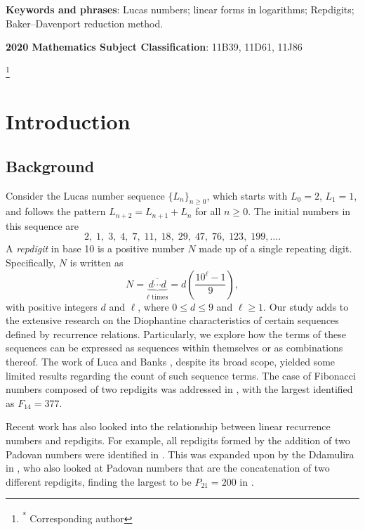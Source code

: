 \maketitle
\begin{abstract}
  Let $ \{L_n\}_{n\geq 0} $ be the sequence of Lucas numbers. In this paper, we determine all Lucas numbers that are palindromic concatenations of two distinct repdigits.
\end{abstract}

{\bf Keywords and phrases}: Lucas numbers; linear forms in logarithms; Repdigits; Baker--Davenport reduction method.
 
{\bf 2020 Mathematics Subject Classification}: 11B39, 11D61, 11J86

\thanks{\textsuperscript{*} Corresponding author}

\section{Introduction}\label{intro}
\subsection{Background}
\label{sec:1.1}
Consider the Lucas number sequence $\{L_n\}_{n\ge 0}$, which starts with $L_0=2$, $L_1=1$, and follows the pattern $L_{n+2}=L_{n+1}+L_{n}$ for all $n \geq 0$. The initial numbers in this sequence are
$$
2,\;1,\;3,\;4,\;7,\;11,\;18,\;29,\;47,\;76,\;123,\;199,\ldots.
$$
A \textit{repdigit} in base 10 is a positive number $N$ made up of a single repeating digit. Specifically, $N$ is written as
\[
N = \underbrace{\overline{d\cdots d}}_{\ell \text{ times}} = d \left( \frac{10^\ell - 1}{9} \right),
\]
with positive integers \(d\) and \( \ell \), where \(0 \leq d \leq 9\) and \( \ell \geq 1\). Our study adds to the extensive research on the Diophantine characteristics of certain sequences defined by recurrence relations. Particularly, we explore how the terms of these sequences can be expressed as sequences within themselves or as combinations thereof. The work of Luca and Banks \cite{banks}, despite its broad scope, yielded some limited results regarding the count of such sequence terms. The case of Fibonacci numbers composed of two repdigits was addressed in \cite{ala}, with the largest identified as \(F_{14} = 377\).

Recent work has also looked into the relationship between linear recurrence numbers and repdigits. For example, all repdigits formed by the addition of two Padovan numbers were identified in \cite{gar}. This was expanded upon by the Ddamulira in \cite{dda}, who also looked at Padovan numbers that are the concatenation of two different repdigits, finding the largest to be \(P_{21} = 200\) in \cite{dda2}.

